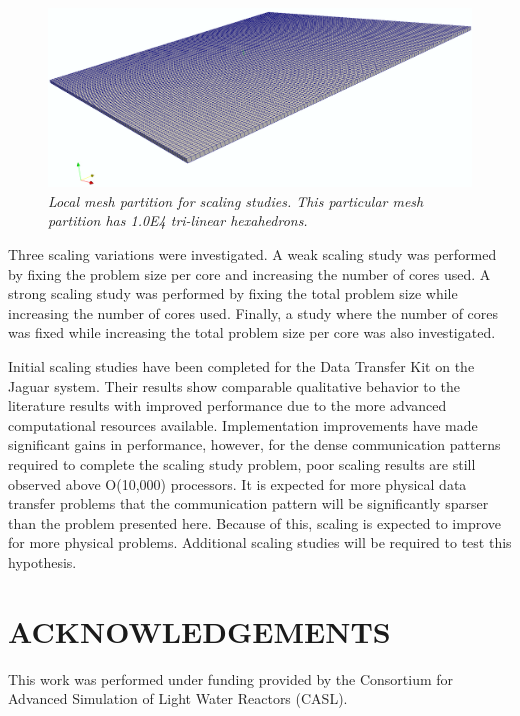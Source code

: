 \documentclass{mc2013}
\begin{document}
\begin{figure}[htpb!]
  \centering \includegraphics[width=5.5in]{mesh.png}
  \caption{\sl Local mesh partition for scaling studies. This
    particular mesh partition has 1.0E4 tri-linear hexahedrons.}
  \label{fig:mesh_partition}
\end{figure}

Three scaling variations were investigated. A weak scaling study was
performed by fixing the problem size per core and increasing the
number of cores used. A strong scaling study was performed by fixing
the total problem size while increasing the number of cores
used. Finally, a study where the number of cores was fixed while
increasing the total problem size per core was also investigated.



Initial scaling studies have been completed for the Data Transfer Kit
on the Jaguar system. Their results show comparable qualitative
behavior to the literature results with improved performance due to
the more advanced computational resources available. Implementation
improvements have made significant gains in performance, however, for
the dense communication patterns required to complete the scaling
study problem, poor scaling results are still observed above O(10,000)
processors. It is expected for more physical data transfer problems
that the communication pattern will be significantly sparser than the
problem presented here. Because of this, scaling is expected to
improve for more physical problems. Additional scaling studies will be
required to test this hypothesis.


\section*{ACKNOWLEDGEMENTS}

This work was performed under funding provided by the Consortium for
Advanced Simulation of Light Water Reactors (CASL).

\setlength{\baselineskip}{12pt}

\end{document}
